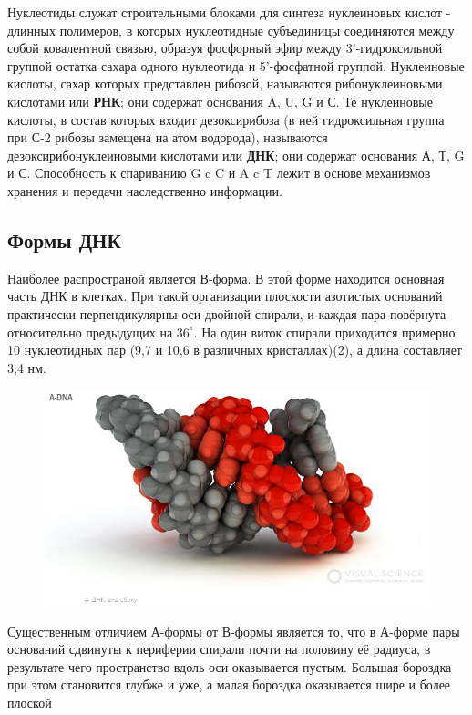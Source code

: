\documentclass[a4paper, 12pt]{article}
\begin{document}
	Нуклеотиды служат
	строительными блоками для синтеза нуклеиновых кислот - длинных полимеров, в которых нуклеотидные субъединицы соединяются между собой
	ковалентной связью, образуя фосфорный эфир между 3'-гидроксильной группой остатка сахара одного нуклеотида и 5'-фосфатной группой. Нуклеиновые кислоты, сахар которых представлен рибозой, называются рибонуклеиновыми кислотами или \textbf{РНК}; они
	содержат основания A, U, G и С. Те нуклеиновые кислоты, в состав которых входит дезоксирибоза (в ней гидроксильная группа при С-2 рибозы
	замещена на атом водорода), называются дезоксирибонуклеиновыми кислотами или \textbf{ДНК}; они содержат основания А, Т, G и С. Способность к спариванию G c C и A c T лежит в основе механизмов хранения и передачи наследственно информации.
	
	\subsection{Формы ДНК}
	Наиболее распространой является В-форма. В этой форме находится основная часть ДНК в клетках. При такой организации плоскости азотистых оснований практически перпендикулярны оси двойной спирали, и каждая пара повёрнута относительно предыдущих на $36^\circ$. На один виток спирали приходится примерно 10 нуклеотидных пар (9,7 и 10,6 в различных кристаллах)(2), а длина составляет 3,4 нм.
	\begin{figure}[H]
		\centering
		\includegraphics[scale = 0.5]{2adnk}
	\end{figure}
Существенным отличием А-формы от В-формы является то, что в А-форме пары оснований сдвинуты к периферии спирали почти на половину её радиуса, в результате чего пространство вдоль оси оказывается пустым. Большая бороздка при этом становится глубже и уже, а малая бороздка оказывается шире и более плоской
\end{document}
